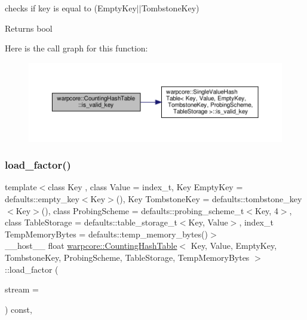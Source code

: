 checks if {\ttfamily key} is equal to {\ttfamily }(Empty\+Key$\vert$$\vert$\+Tombstone\+Key) 

\begin{DoxyReturn}{Returns}
{\ttfamily bool} 
\end{DoxyReturn}
Here is the call graph for this function\+:
\nopagebreak
\begin{figure}[H]
\begin{center}
\leavevmode
\includegraphics[width=350pt]{classwarpcore_1_1CountingHashTable_ab186fb0eadd3f5d1cd5bc290489ab0df_cgraph}
\end{center}
\end{figure}
\mbox{\label{classwarpcore_1_1CountingHashTable_ad4a829b15a3add41133437c17ab6bf67}} 
\subsubsection{\texorpdfstring{load\+\_\+factor()}{load\_factor()}}
{\footnotesize\ttfamily template$<$class Key , class Value  = index\+\_\+t, Key Empty\+Key = defaults\+::empty\+\_\+key$<$\+Key$>$(), Key Tombstone\+Key = defaults\+::tombstone\+\_\+key$<$\+Key$>$(), class Probing\+Scheme  = defaults\+::probing\+\_\+scheme\+\_\+t$<$\+Key, 4$>$, class Table\+Storage  = defaults\+::table\+\_\+storage\+\_\+t$<$\+Key, Value$>$, index\+\_\+t Temp\+Memory\+Bytes = defaults\+::temp\+\_\+memory\+\_\+bytes()$>$ \\
\+\_\+\+\_\+host\+\_\+\+\_\+ float \hyperlink{classwarpcore_1_1CountingHashTable}{warpcore\+::\+Counting\+Hash\+Table}$<$ Key, Value, Empty\+Key, Tombstone\+Key, Probing\+Scheme, Table\+Storage, Temp\+Memory\+Bytes $>$\+::load\+\_\+factor (\begin{DoxyParamCaption}\item[{cuda\+Stream\+\_\+t}]{stream = {} }\end{DoxyParamCaption}) const\hspace{0.3cm}{\ttfamily [inline]}, {\ttfamily [noexcept]}}



